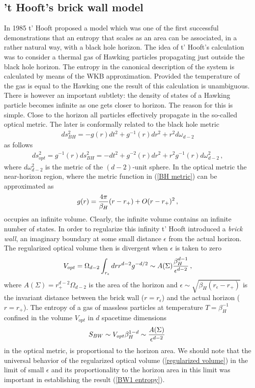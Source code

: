 \documentclass[12pt]{article}
\def\be{\begin{eqnarray}}
\def\ee{\end{eqnarray}}
\def\lb{\label}
\def\o{\over}
\begin{document}
                            
                            
                            
\subsection{ 't Hooft's brick wall model}
                             
In 1985 t' Hooft \cite{'tHooft:1984re} proposed a model which was one of the first successful demonstrations that an entropy that scales as an area
can be associated, in a rather natural way, with a black hole horizon.     The idea of t' Hooft's calculation was to consider a thermal gas of Hawking particles propagating just outside the black hole horizon.   The entropy in the canonical description   of the system is calculated by means of the WKB approximation.
 Provided the temperature of the gas is equal to the Hawking one the result of this calculation  is unambiguous.  There is however an important subtlety:
the density of states of a Hawking particle becomes infinite as one gets closer to  horizon. The reason for this is simple. 
Close to the horizon all particles effectively propagate in the so-called optical metric. The later is conformally related to the black hole metric
\be
ds^2_{BH}=-g(r)dt^2+g^{-1}(r)dr^2+r^2d\omega_{d-2}
\lb{BH metric}
\ee
as follows
\be
ds^2_{opt}=g^{-1}(r)ds^2_{BH}=-dt^2+g^{-2}(r)dr^2+r^2g^{-1}(r)d\omega^2_{d-2}\, ,
\lb{optical}
\ee
where $d\omega^2_{d-2}$ is the metric of the $(d-2)$-unit sphere.
 In the optical  metric the near-horizon region, where the metric function in (\ref{BH metric}) can be approximated as
 $$
 g(r)={4\pi\o \beta_H}(r-r_+)+O(r-r_+)^2\, ,
 $$ 
 occupies an infinite volume. 
Clearly, the infinite volume contains  an infinite number of states.
In order to regularize this infinity t' Hooft   introduced a {\it brick wall}, an imaginary boundary  at some small  distance  $\epsilon$ 
from the actual horizon.  The regularized optical volume then is divergent when $\epsilon$ is taken to zero
\be
V_{opt}=\Omega_{d-2}\int_{r_\epsilon} dr r^{d-2}g^{-d/2}\sim A(\Sigma){\beta_H^{d-1}\o \epsilon^{d-2}}\, ,
\lb{regularized volume}
\ee
where $A(\Sigma)=r^{d-2}_+\Omega_{d-2}$ is the area of the  horizon and $\epsilon\sim\sqrt{\beta_H(r_\epsilon-r_+)}$ is the invariant distance between the brick wall ($r=r_\epsilon$) and the actual horizon ($r=r_+$).
The entropy of a gas of massless particles at temperature $T=\beta^{-1}_H$ confined in the volume $V_{opt}$ in $d$ spacetime dimensions  
\be
S_{BW}\sim V_{opt}\beta_H^{1-d}\sim {A(\Sigma)\o \epsilon^{d-2}}\, 
\lb{BW1 entropy}
\ee
in the optical metric, is  proportional to the horizon area. We should note that the universal behavior of the regularized optical volume (\ref{regularized volume}) in the limit of small $\epsilon$
and its proportionality to the horizon area in this limit was important in establishing the result (\ref{BW1 entropy}).
\end{document}
